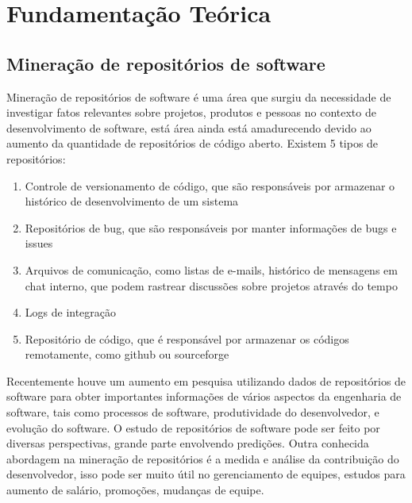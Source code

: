\chapter[Fundamentação Teórica]{Fundamentação Teórica}
\section{Mineração de repositórios de software} 
Mineração de repositórios de software é uma área que surgiu da necessidade de investigar fatos relevantes sobre projetos, produtos e pessoas no contexto de desenvolvimento de software, está área ainda está amadurecendo devido ao aumento da quantidade de repositórios de código aberto. 
    Existem 5 tipos de repositórios:
\begin{enumerate}
\item Controle de versionamento de código, que são responsáveis por armazenar o histórico de desenvolvimento de um sistema
\item Repositórios de bug, que são responsáveis por manter informações de bugs e issues 
\item Arquivos de comunicação, como listas de e-mails, histórico de mensagens em chat interno, que podem rastrear discussões sobre projetos através do tempo
\item Logs de integração 
\item Repositório de código, que é responsável por armazenar os códigos remotamente, como github ou sourceforge
\end{enumerate}
Recentemente houve um aumento em pesquisa utilizando dados de repositórios de software para obter importantes informações de vários aspectos da engenharia de software, tais como processos de software, produtividade do desenvolvedor, e evolução do software. O estudo de repositórios de software pode ser feito por diversas perspectivas, grande parte envolvendo predições. Outra conhecida abordagem na mineração de repositórios é a medida e análise da contribuição do desenvolvedor, isso pode ser muito útil no gerenciamento de equipes, estudos para aumento de salário, promoções, mudanças de equipe.
